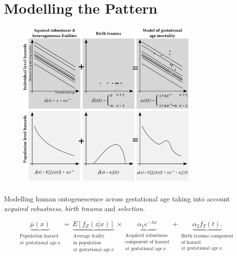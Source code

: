 \documentclass{beamer}
\begin{document}
\section{Modelling the Pattern} %

\begin{frame}
\frametitle{\insertsection}

\begin{figure}[htb!]
\includegraphics[width = 0.8\textwidth]{./fig/the_model.pdf}\\
\end{figure}

\end{frame}


\begin{frame}
\frametitle{\insertsection}

Modelling human ontogenescence across gestational age taking into account \emph{acquired robustness}, \emph{birth trauma} and \emph{selection}.

\begin{equation*}
  \underbrace{
    \overline{\mu}(x)
  }_{\substack{
    \text{Population hazard}\\ \text{at gestational age}~x
  }} =
  \underbrace{
    E[f_Z(z|x)]
  }_{\substack{
    \text{Average frailty}\\ \text{in population}\\ \text{at gestational age}~x
  }} \times
  \underbrace{
    \alpha_1 e^{-\lambda x}
  }_{\substack{
    \text{Acquired robustness}\\ \text{component of hazard}\\ \text{at gestational age}~x
  }} +
  \underbrace{
    \alpha_2 f_T(t).
  }_{\substack{
    \text{Birth trauma component}\\ \text{of hazard}\\ \text{at gestational age}~x.
  }}
\end{equation*}

\end{frame}
\end{document}
